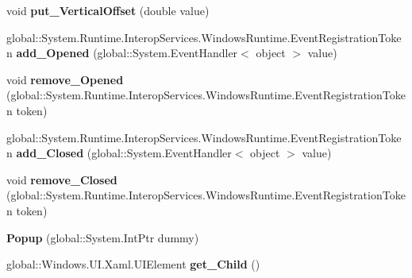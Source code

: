 \begin{DoxyCompactItemize}
void {\bfseries put\+\_\+\+Vertical\+Offset} (double value)
\item 
\mbox{\label{class_windows_1_1_u_i_1_1_xaml_1_1_controls_1_1_primitives_1_1_popup_a8b0251aa9963ecedfdcfe3e2def06542}} 
global\+::\+System.\+Runtime.\+Interop\+Services.\+Windows\+Runtime.\+Event\+Registration\+Token {\bfseries add\+\_\+\+Opened} (global\+::\+System.\+Event\+Handler$<$ object $>$ value)
\item 
\mbox{\label{class_windows_1_1_u_i_1_1_xaml_1_1_controls_1_1_primitives_1_1_popup_aac5bdd545f4a48100c8fa489c320115d}} 
void {\bfseries remove\+\_\+\+Opened} (global\+::\+System.\+Runtime.\+Interop\+Services.\+Windows\+Runtime.\+Event\+Registration\+Token token)
\item 
\mbox{\label{class_windows_1_1_u_i_1_1_xaml_1_1_controls_1_1_primitives_1_1_popup_aab8f3210f2e0f3757fa03b86108c4603}} 
global\+::\+System.\+Runtime.\+Interop\+Services.\+Windows\+Runtime.\+Event\+Registration\+Token {\bfseries add\+\_\+\+Closed} (global\+::\+System.\+Event\+Handler$<$ object $>$ value)
\item 
\mbox{\label{class_windows_1_1_u_i_1_1_xaml_1_1_controls_1_1_primitives_1_1_popup_a6296c37154aa1e45ab4075199c3672ed}} 
void {\bfseries remove\+\_\+\+Closed} (global\+::\+System.\+Runtime.\+Interop\+Services.\+Windows\+Runtime.\+Event\+Registration\+Token token)
\item 
\mbox{\label{class_windows_1_1_u_i_1_1_xaml_1_1_controls_1_1_primitives_1_1_popup_a4eb29b9974f43030c2c16d2c04ff7121}} 
{\bfseries Popup} (global\+::\+System.\+Int\+Ptr dummy)
\item 
\mbox{\label{class_windows_1_1_u_i_1_1_xaml_1_1_controls_1_1_primitives_1_1_popup_ae0a14f98eaf6c2db22f78c0eb540c36f}} 
global\+::\+Windows.\+U\+I.\+Xaml.\+U\+I\+Element {\bfseries get\+\_\+\+Child} ()
\item 
\mbox{\label{class_windows_1_1_u_i_1_1_xaml_1_1_controls_1_1_primitives_1_1_popup_a59a124fba4b518e1cbd3eb75d64476cf}} 

\end{DoxyCompactItemize}
